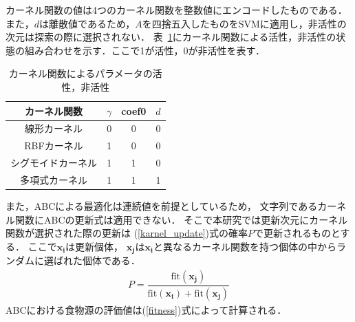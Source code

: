 カーネル関数の値は4つのカーネル関数を整数値にエンコードしたものである．
また，$d$は離散値であるため，$A$を四捨五入したものをSVMに適用し，非活性の次元は探索の際に選択されない．
表~\ref{tab:param}にカーネル関数による活性，非活性の状態の組み合わせを示す．ここで1が活性，0が非活性を表す．
\begin{table}[t]
    \centering
    \caption{カーネル関数によるパラメータの活性，非活性}  %
    \begin{tabular}{|c|c|c|c|}  %
        \hline  %
        カーネル関数 & $\gamma$ & coef0 & $d$\\  %
        \hline  %
        線形カーネル& 0& 0& 0\\  %
        \hline  %
        RBFカーネル & 1 & 0& 0\\  %
        \hline  %
        シグモイドカーネル & 1 & 1& 0\\  %
        \hline  %
        多項式カーネル & 1 & 1& 1\\  %
        \hline  %
    \end{tabular}
    
    \label{tab:param}  %
  \end{table} %
  
また，ABCによる最適化は連続値を前提としているため，
文字列であるカーネル関数にABCの更新式は適用できない．
そこで本研究では更新次元にカーネル関数が選択された際の更新は
(\ref{karnel_update})式の確率$P$で更新されるものとする．
ここで$\boldsymbol{x_i}$は更新個体，
$\boldsymbol{x_j}$は$\boldsymbol{x_i}$と異なるカーネル関数を持つ個体の中からランダムに選ばれた個体である．
\begin{align}
    \label{karnel_update}
   P = \dfrac{\mathrm{fit}(\boldsymbol{x_j})}{\mathrm{fit}(\boldsymbol{x_i})+\mathrm{fit}(\boldsymbol{x_j})}
\end{align}
ABCにおける食物源の評価値は(\ref{fitness})式によって計算される．
